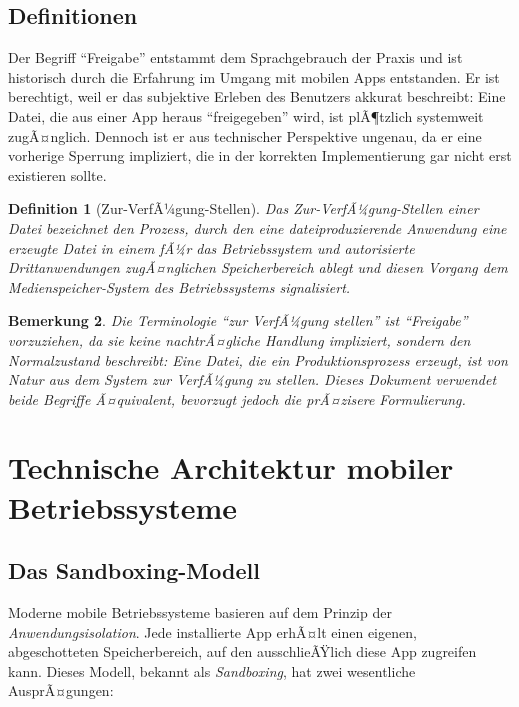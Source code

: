 ﻿\documentclass[12pt, a4paper]{article}
\newtheorem{definition}{Definition}[section]
\newtheorem{bemerkung}[definition]{Bemerkung}
\begin{document}
\subsection{Definitionen}

Der Begriff \enquote{Freigabe} entstammt dem Sprachgebrauch der Praxis und ist historisch
durch die Erfahrung im Umgang mit mobilen Apps entstanden. Er ist berechtigt, weil er
das subjektive Erleben des Benutzers akkurat beschreibt: Eine Datei, die aus einer App
heraus \enquote{freigegeben} wird, ist plÃ¶tzlich systemweit zugÃ¤nglich. Dennoch ist
er aus technischer Perspektive ungenau, da er eine vorherige Sperrung impliziert, die
in der korrekten Implementierung gar nicht erst existieren sollte.

\begin{definition}[Zur-VerfÃ¼gung-Stellen]
\label{def:verfuegbarstellen}
Das \emph{Zur-VerfÃ¼gung-Stellen} einer Datei bezeichnet den Prozess, durch den eine
dateiproduzierende Anwendung eine erzeugte Datei in einem fÃ¼r das Betriebssystem
und autorisierte Drittanwendungen zugÃ¤nglichen Speicherbereich ablegt und diesen
Vorgang dem Medienspeicher-System des Betriebssystems signalisiert.
\end{definition}

\begin{bemerkung}
Die Terminologie \enquote{zur VerfÃ¼gung stellen} ist \enquote{Freigabe} vorzuziehen,
da sie keine nachtrÃ¤gliche Handlung impliziert, sondern den Normalzustand beschreibt:
Eine Datei, die ein Produktionsprozess erzeugt, ist \emph{von Natur aus} dem System
zur VerfÃ¼gung zu stellen. Dieses Dokument verwendet beide Begriffe Ã¤quivalent,
bevorzugt jedoch die prÃ¤zisere Formulierung.
\end{bemerkung}

\section{Technische Architektur mobiler Betriebssysteme}
\label{sec:architektur}

\subsection{Das Sandboxing-Modell}

Moderne mobile Betriebssysteme basieren auf dem Prinzip der \emph{Anwendungsisolation}.
Jede installierte App erhÃ¤lt einen eigenen, abgeschotteten Speicherbereich, auf den
ausschlieÃŸlich diese App zugreifen kann. Dieses Modell, bekannt als \emph{Sandboxing},
hat zwei wesentliche AusprÃ¤gungen:
\end{document}
